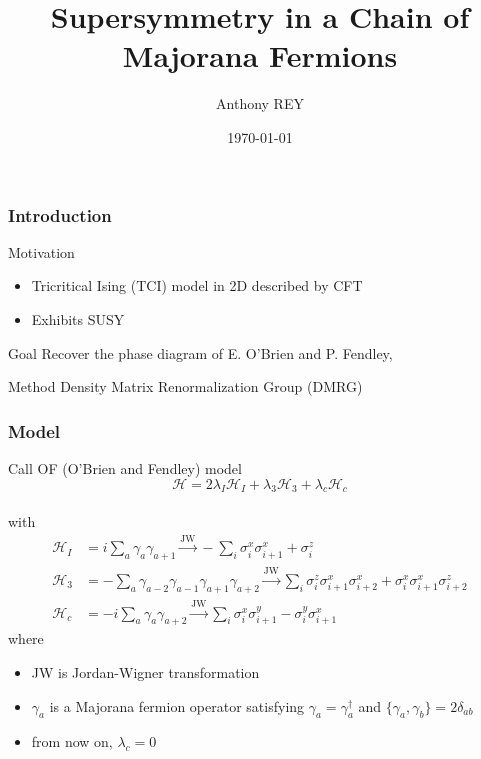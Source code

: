 \documentclass[10pt]{beamer}
\title{Supersymmetry in a Chain of \\Majorana Fermions}
\author{Anthony REY}
\institute{\'Ecole Polytechnique Fédérale de Lausanne}
\date{\today}
\begin{document}

\frame{\titlepage}

\begin{frame}
    \frametitle{Introduction}

    \begin{block}{Motivation}
        \begin{itemize}
            \item Tricritical Ising (TCI) model in 2D described by CFT
            \pause
            \item Exhibits SUSY
        \end{itemize}
    \end{block}


    \pause
    \vspace{1cm}
    \begin{block}{Goal}
        Recover the phase diagram of E. O'Brien and P. Fendley, \href{https://link.aps.org/doi/10.1103/PhysRevLett.120.206403}{}
    \end{block}

    \pause
    \begin{block}{Method}
        Density Matrix Renormalization Group (DMRG)
    \end{block}
\end{frame}

\begin{frame}
    \frametitle{Model}
    
    Call OF (O'Brien and Fendley) model
    $$\mathcal{H} = 2\lambda_I \mathcal{H}_I + \lambda_3 \mathcal{H}_3 + \lambda_c \mathcal{H}_c$$\\
    with $$\begin{aligned} \mathcal{H}_I &= i \sum_a \gamma_a\gamma_{a+1} \xrightarrow{\text{JW}} -\sum_i \sigma^x_i\sigma^x_{i+1} + \sigma^z_i \\ \mathcal{H}_3 &= - \sum_a \gamma_{a-2}\gamma_{a-1}\gamma_{a+1}\gamma_{a+2} \xrightarrow{\text{JW}} \sum_i \sigma^z_i\sigma^x_{i+1}\sigma^x_{i+2} + \sigma^x_i\sigma^x_{i+1}\sigma^z_{i+2} \\ \mathcal{H}_c &= -i \sum_a \gamma_a\gamma_{a+2} \xrightarrow{\text{JW}} \sum_i \sigma^x_i\sigma^y_{i+1} - \sigma^y_i\sigma^x_{i+1} \end{aligned}$$
    where 
    \begin{itemize}
        \item JW is Jordan-Wigner transformation
        \item $\gamma_a$ is a Majorana fermion operator satisfying $\gamma_a = \gamma_a^\dagger$ and $\{\gamma_a, \gamma_b\} = 2\delta_{ab}$
        \item from now on, $\lambda_c=0$
    \end{itemize}
\end{frame}
\end{document}

